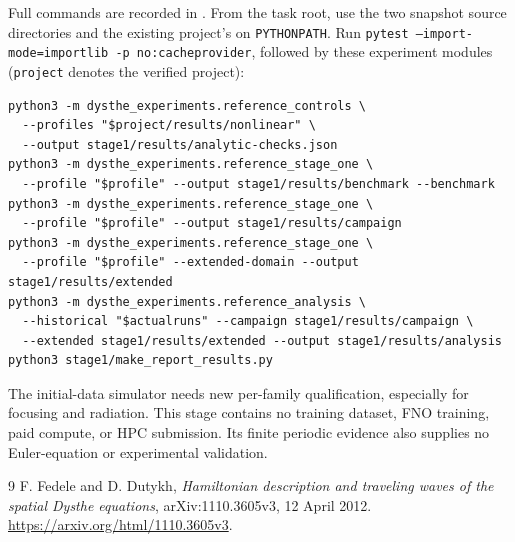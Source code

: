\documentclass[11pt]{article}
\begin{document}
Full commands are recorded in . From the task root,
use the two snapshot source directories and the existing project's
 on \texttt{PYTHONPATH}. Run
\texttt{pytest --import-mode=importlib -p no:cacheprovider}, followed by
these experiment modules (\texttt{project} denotes the verified project):
\begin{verbatim}
python3 -m dysthe_experiments.reference_controls \
  --profiles "$project/results/nonlinear" \
  --output stage1/results/analytic-checks.json
python3 -m dysthe_experiments.reference_stage_one \
  --profile "$profile" --output stage1/results/benchmark --benchmark
python3 -m dysthe_experiments.reference_stage_one \
  --profile "$profile" --output stage1/results/campaign
python3 -m dysthe_experiments.reference_stage_one \
  --profile "$profile" --extended-domain --output stage1/results/extended
python3 -m dysthe_experiments.reference_analysis \
  --historical "$actualruns" --campaign stage1/results/campaign \
  --extended stage1/results/extended --output stage1/results/analysis
python3 stage1/make_report_results.py
\end{verbatim}
The initial-data simulator needs new per-family qualification, especially
for focusing and radiation. This stage contains no training dataset, FNO
training, paid compute, or HPC submission. Its finite periodic evidence
also supplies no Euler-equation or experimental validation.

\begin{thebibliography}{9}
F. Fedele and D. Dutykh,
\emph{Hamiltonian description and traveling waves of the spatial Dysthe
 equations}, arXiv:1110.3605v3, 12 April 2012.
\url{https://arxiv.org/html/1110.3605v3}.
\end{thebibliography}
\end{document}

